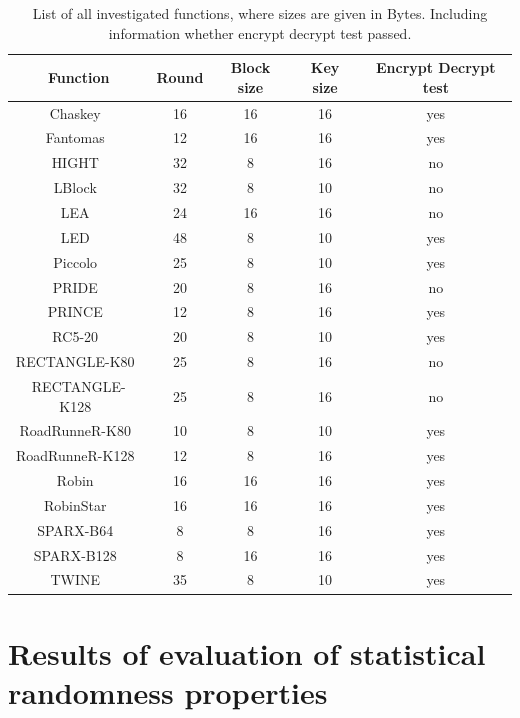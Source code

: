 \documentclass[
    digital,    %
    oneside,    %
    color,
    11pt,
    nocover,
    notable,
    nolof,
    nolot,
    final
]{fithesis3}
\begin{document}
\begin{table}[t]
	\centering
	\begin{tabular}{c|c c c c}
		\textbf{\large Function} & \textbf{\large Round} & \textbf{\large Block size} & \textbf{\large Key size} & \textbf{\large Encrypt Decrypt test}\\ \hline
		Chaskey~\cite{cryptoeprint:2014:386}				& 16	& 16	& 16	& yes 	\\ \hline
		Fantomas~\cite{grosso2014ls}						& 12	& 16	& 16	& yes 	\\ \hline
		HIGHT~\cite{10.1007/11894063_4}						& 32	& 8		& 16	& no 	\\ \hline
		LBlock~\cite{10.1007/978-3-642-21554-4_19}			& 32	& 8		& 10	& no \\ \hline
		LEA~\cite{Hong2013LEAA1}							& 24	& 16	& 16	& no \\ \hline
		LED~\cite{Guo:2011:LBC:2044928.2044958}				& 48	& 8		& 10	& yes \\ \hline
		Piccolo~\cite{10.1007/978-3-642-23951-9_23}			& 25	& 8		& 10	& yes \\ \hline
		PRIDE~\cite{10.1007/978-3-662-44371-2_4}			& 20	& 8		& 16	& no  \\ \hline
		PRINCE~\cite{10.1007/978-3-642-34961-4_14}			& 12	& 8		& 16	& yes \\ \hline
		RC5-20~\cite{10.1007/3-540-60590-8_7}				& 20	& 8		& 10	& yes \\ \hline
		RECTANGLE-K80~\cite{Zhang2015}						& 25	& 8		& 16	& no \\ \hline
		RECTANGLE-K128~\cite{Zhang2015}						& 25	& 8		& 16	& no \\ \hline
		RoadRunneR-K80~\cite{10.1007/978-3-319-29078-2_4}	& 10	& 8		& 10	& yes \\ \hline
		RoadRunneR-K128~\cite{10.1007/978-3-319-29078-2_4}	& 12	& 8		& 16	& yes \\ \hline
		Robin~\cite{grosso2014ls}							& 16	& 16	& 16	& yes \\ \hline
		RobinStar~\cite{grosso2014ls}						& 16	& 16	& 16	& yes \\ \hline
		SPARX-B64~\cite{10.1007/978-3-662-53887-6_18}		& 8		& 8		& 16	& yes \\ \hline
		SPARX-B128~\cite{10.1007/978-3-662-53887-6_18}		& 8		& 16	& 16	& yes \\ \hline
		TWINE~\cite{twine}									& 35	& 8		& 10	& yes \\ \hline
		
		
	\end{tabular}
	\caption{List of all investigated functions, where sizes are given in Bytes. Including information whether encrypt decrypt test passed.}
	\label{table:list-of-investigated functions}
\end{table}



\chapter{Results of evaluation of statistical randomness properties}



\printbibliography[heading=bibintoc] %

\appendix{}
\end{document}
